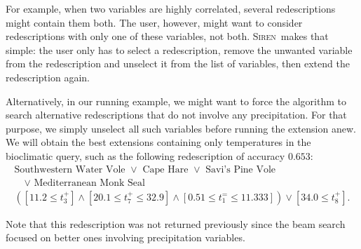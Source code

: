 \documentclass{llncs}
\newcommand{\Siren}{\textsc{Siren}}
\begin{document}
For example, when two variables are highly
correlated, several redescriptions might contain them
both. The user, however, might want to consider
redescriptions with only one of these variables, not
both. \Siren\ makes that simple: the user only has to select a
redescription, remove the unwanted variable from the
redescription and unselect it from the list of variables, then extend the
redescription again. 

Alternatively, in our running example, we might want to force the
algorithm to search alternative redescriptions that do not involve any
 precipitation. For that purpose, we simply unselect all such
variables before running the extension anew. We will obtain the best
extensions containing only temperatures in the bioclimatic query, such
as the following redescription of accuracy $0.653$:
\begin{equation*}
\begin{array}{l}
\text{Southwestern Water Vole }\lor\text{ Cape Hare }\lor\text{ Savi's Pine Vole }\\[1mm]
\quad\lor\text{ Mediterranean Monk Seal}\\[3mm]
( [11.2 \leq t_{3}^{+}] \land  [20.1 \leq t_{7}^{+} \leq 32.9] %
\land  [0.51 \leq t_{1}^{=} \leq 11.333]) \lor  [34.0 \leq t_{8}^{+}].
\end{array}
\end{equation*}

Note that this redescription was not returned previously since the
beam search focused on better ones involving precipitation variables.


\end{document}
